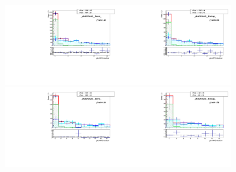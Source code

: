 \begin{figure}[htb]
  \begin{center}
   \includegraphics[width=0.45\textwidth]{../figs/figs_v11/ELECTRON_WGamma/TemplateFits/c_TEMPL_CHISO_UNblind__phoEt35to45__Barrel__RooFit_MCclosure.pdf}\includegraphics[width=0.45\textwidth]{../figs/figs_v11/ELECTRON_WGamma/TemplateFits/c_TEMPL_CHISO_UNblind__phoEt35to45__Endcap__RooFit_MCclosure.pdf}\\
   \includegraphics[width=0.45\textwidth]{../figs/figs_v11/ELECTRON_WGamma/TemplateFits/c_TEMPL_CHISO_UNblind__phoEt45to55__Barrel__RooFit_MCclosure.pdf}\includegraphics[width=0.45\textwidth]{../figs/figs_v11/ELECTRON_WGamma/TemplateFits/c_TEMPL_CHISO_UNblind__phoEt45to55__Endcap__RooFit_MCclosure.pdf}\\

\end{center}
\end{figure}
